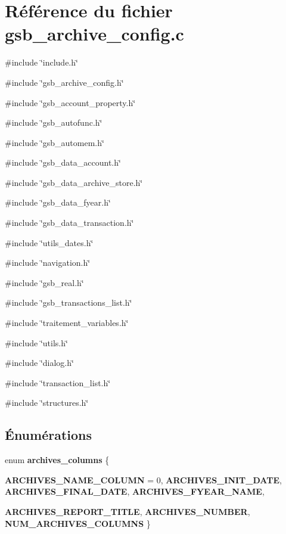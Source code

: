 \section{Référence du fichier gsb\_\-archive\_\-config.c}
\label{gsb__archive__config_8c}
{\ttfamily \#include \char`\"{}include.h\char`\"{}}\par
{\ttfamily \#include \char`\"{}gsb\_\-archive\_\-config.h\char`\"{}}\par
{\ttfamily \#include \char`\"{}gsb\_\-account\_\-property.h\char`\"{}}\par
{\ttfamily \#include \char`\"{}gsb\_\-autofunc.h\char`\"{}}\par
{\ttfamily \#include \char`\"{}gsb\_\-automem.h\char`\"{}}\par
{\ttfamily \#include \char`\"{}gsb\_\-data\_\-account.h\char`\"{}}\par
{\ttfamily \#include \char`\"{}gsb\_\-data\_\-archive\_\-store.h\char`\"{}}\par
{\ttfamily \#include \char`\"{}gsb\_\-data\_\-fyear.h\char`\"{}}\par
{\ttfamily \#include \char`\"{}gsb\_\-data\_\-transaction.h\char`\"{}}\par
{\ttfamily \#include \char`\"{}utils\_\-dates.h\char`\"{}}\par
{\ttfamily \#include \char`\"{}navigation.h\char`\"{}}\par
{\ttfamily \#include \char`\"{}gsb\_\-real.h\char`\"{}}\par
{\ttfamily \#include \char`\"{}gsb\_\-transactions\_\-list.h\char`\"{}}\par
{\ttfamily \#include \char`\"{}traitement\_\-variables.h\char`\"{}}\par
{\ttfamily \#include \char`\"{}utils.h\char`\"{}}\par
{\ttfamily \#include \char`\"{}dialog.h\char`\"{}}\par
{\ttfamily \#include \char`\"{}transaction\_\-list.h\char`\"{}}\par
{\ttfamily \#include \char`\"{}structures.h\char`\"{}}\par
\subsection*{Énumérations}
\begin{DoxyCompactItemize}
\item 
enum {\bf archives\_\-columns} \{ \par
{\bf ARCHIVES\_\-NAME\_\-COLUMN} =  0, 
{\bf ARCHIVES\_\-INIT\_\-DATE}, 
{\bf ARCHIVES\_\-FINAL\_\-DATE}, 
{\bf ARCHIVES\_\-FYEAR\_\-NAME}, 
\par
{\bf ARCHIVES\_\-REPORT\_\-TITLE}, 
{\bf ARCHIVES\_\-NUMBER}, 
{\bf NUM\_\-ARCHIVES\_\-COLUMNS}
 \}
\end{DoxyCompactItemize}
